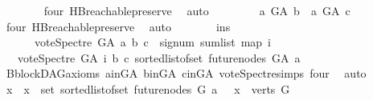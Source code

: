\begin{isabellebody}
\ \ \ \ \ \ \isamarkupfalse%
\ four\ HB{}{\isachardot}{\kern0pt}reachable{}{\isacharunderscore}{\kern0pt}preserve\ \isamarkupfalse%
\ auto\isanewline
\ \ \ \ \isamarkupfalse%
\ \isamarkupfalse%
\ {\isachardoublequoteopen}{\isasymnot}\ {\isacharparenleft}{\kern0pt}a\ {\isasymrightarrow}\isactrlsup {\isacharplus}{\kern0pt}\isactrlbsub G{\isacharunderscore}{\kern0pt}A\isactrlesub \ b\ {\isasymand}\ a\ {\isasymrightarrow}\isactrlsup {\isacharplus}{\kern0pt}\isactrlbsub G{\isacharunderscore}{\kern0pt}A\isactrlesub \ c{\isacharparenright}{\kern0pt}{\isachardoublequoteclose}\ \isamarkupfalse%
\ four\ HB{}{\isachardot}{\kern0pt}reachable{}{\isacharunderscore}{\kern0pt}preserve\ \isamarkupfalse%
\ auto\isanewline
\ \ \ \ \isamarkupfalse%
\ \isamarkupfalse%
\ ins{}{\isacharcolon}{\kern0pt}\isanewline
\ \ \ \ \ \ {\isachardoublequoteopen}vote{\isacharunderscore}{\kern0pt}Spectre\ G{\isacharunderscore}{\kern0pt}A\ a\ b\ c\ {\isacharequal}{\kern0pt}\ signum\ {\isacharparenleft}{\kern0pt}sum{\isacharunderscore}{\kern0pt}list\ {\isacharparenleft}{\kern0pt}map\ {\isacharparenleft}{\kern0pt}{\isasymlambda}i{\isachardot}{\kern0pt}\isanewline
\ \ \ {\isacharparenleft}{\kern0pt}vote{\isacharunderscore}{\kern0pt}Spectre\ G{\isacharunderscore}{\kern0pt}A\ i\ b\ c{\isacharparenright}{\kern0pt}{\isacharparenright}{\kern0pt}\ {\isacharparenleft}{\kern0pt}sorted{\isacharunderscore}{\kern0pt}list{\isacharunderscore}{\kern0pt}of{\isacharunderscore}{\kern0pt}set\ {\isacharparenleft}{\kern0pt}future{\isacharunderscore}{\kern0pt}nodes\ G{\isacharunderscore}{\kern0pt}A\ a{\isacharparenright}{\kern0pt}{\isacharparenright}{\kern0pt}{\isacharparenright}{\kern0pt}{\isacharparenright}{\kern0pt}{\isachardoublequoteclose}\isanewline
\ \ \ \ \ \ \isamarkupfalse%
\ B{}{\isachardot}{\kern0pt}blockDAG{\isacharunderscore}{\kern0pt}axioms\ a{\isacharunderscore}{\kern0pt}in{\isacharunderscore}{\kern0pt}G{\isacharunderscore}{\kern0pt}A\ b{\isacharunderscore}{\kern0pt}in{\isacharunderscore}{\kern0pt}G{\isacharunderscore}{\kern0pt}A\ c{\isacharunderscore}{\kern0pt}in{\isacharunderscore}{\kern0pt}G{\isacharunderscore}{\kern0pt}A\ vote{\isacharunderscore}{\kern0pt}Spectre{\isachardot}{\kern0pt}simps\ four\ \isamarkupfalse%
\ auto\isanewline
\ \ \ \ \isamarkupfalse%
\ {\isachardoublequoteopen}{\isasymAnd}x\ {\isachardot}{\kern0pt}\ x\ {\isasymin}\ set\ {\isacharparenleft}{\kern0pt}sorted{\isacharunderscore}{\kern0pt}list{\isacharunderscore}{\kern0pt}of{\isacharunderscore}{\kern0pt}set\ {\isacharparenleft}{\kern0pt}future{\isacharunderscore}{\kern0pt}nodes\ G\ a{\isacharparenright}{\kern0pt}{\isacharparenright}{\kern0pt}\ {\isasymLongrightarrow}\ \ x\ {\isasymin}\ verts\ G\isanewline

\end{isabellebody}
